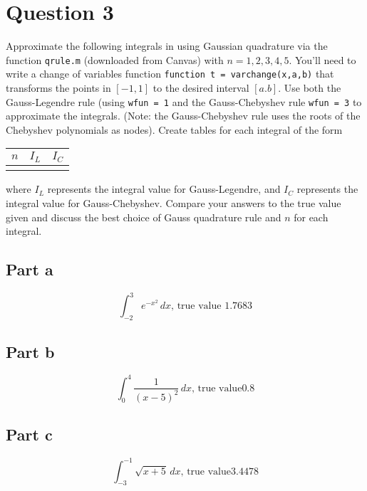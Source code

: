 \section{Question 3}

\begin{question}
    Approximate the following integrals in \MATLAB using Gaussian quadrature via the function \verb+qrule.m+ (downloaded from Canvas) with $n = 1,2,3,4,5$. You'll need to write a change of variables function \verb+function t = varchange(x,a,b)+ that transforms the points in $[-1,1]$ to the desired interval $[a.b]$. Use both the Gauss-Legendre rule (using \verb+wfun = 1+ and the Gauss-Chebyshev rule \verb+wfun = 3+ to approximate the integrals. (Note: the Gauss-Chebyshev rule uses the roots of the Chebyshev polynomials as nodes). Create tables for each integral of the form \begin{tabular}{c|c|c} $n$ & $I_L$ & $I_C$ \\ \hline && \end{tabular} where $I_L$ represents the integral value for Gauss-Legendre, and $I_C$ represents the integral value for Gauss-Chebyshev. Compare your answers to the true value given and discuss the best choice of Gauss quadrature rule and $n$ for each integral.
\end{question}

\subsection{Part a}

\begin{question}
    \begin{equation}
        \int_{-2}^3 e^{-x^2}\, dx\text{, true value } 1.7683
    \end{equation}
\end{question}

\begin{answer}
    
\end{answer}

\subsection{Part b}

\begin{question}
    \begin{equation}
        \int_0^4 \frac{1}{(x-5)^2}\, dx\text{, true value} 0.8
    \end{equation}
\end{question}

\begin{answer}
    
\end{answer}

\subsection{Part c}

\begin{question}
    \begin{equation}
        \int_{-3}^{-1} \sqrt{x+5}\, dx\text{, true value} 3.4478
    \end{equation}
\end{question}

\begin{answer}
    
\end{answer}